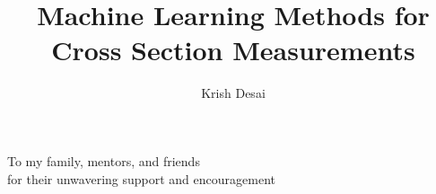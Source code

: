 \documentclass{ucbthesis}
\begin{document}
\title{Machine Learning Methods for Cross Section Measurements}
\author{Krish Desai}


\maketitle
\copyrightpage



\begin{frontmatter}

\begin{dedication}
\null\vfil
\begin{center}
To my family, mentors, and friends\\
\vspace{12pt}
for their unwavering support and encouragement
\end{center}
\vfil\null
\end{dedication}
\clearpage

\tableofcontents
\clearpage

\listoffigures
\clearpage

\listoftables
\clearpage


\end{frontmatter}
\end{document}
